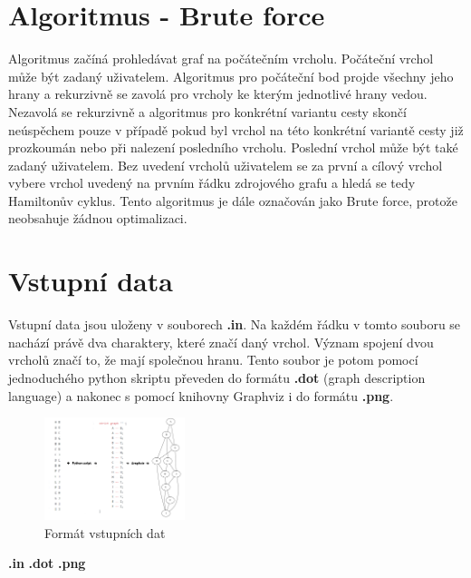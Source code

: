 \documentclass[a4paper,11pt]{article}
\begin{document}
\section{Algoritmus - Brute force}

Algoritmus začíná prohledávat graf na počátečním vrcholu. Počáteční vrchol může být zadaný uživatelem. Algoritmus pro počáteční bod projde všechny jeho hrany a rekurzivně se zavolá pro vrcholy ke kterým jednotlivé hrany vedou. Nezavolá se rekurzivně a algoritmus pro konkrétní variantu cesty skončí neúspěchem pouze v případě pokud byl vrchol na této konkrétní variantě cesty již prozkoumán nebo při nalezení posledního vrcholu. Poslední vrchol může být také zadaný uživatelem. Bez uvedení vrcholů uživatelem se za první a cílový vrchol vybere vrchol uvedený na prvním řádku zdrojového grafu a hledá se tedy Hamiltonův cyklus. Tento algoritmus je dále označován jako Brute force, protože neobsahuje žádnou optimalizaci.

\section{Vstupní data}

Vstupní data jsou uloženy v souborech \textbf{.in}. Na každém řádku v tomto souboru se nachází právě dva charaktery, které značí daný vrchol. Význam spojení dvou vrcholů značí to, že mají společnou hranu. Tento soubor je potom pomocí jednoduchého python skriptu převeden do formátu \textbf{.dot} (graph description language) a nakonec s pomocí knihovny Graphviz\cite{graphviz} i do formátu \textbf{.png}.

\newpage

\begin{figure}[!h]
\caption{Formát vstupních dat}
\includegraphics[width=4.1cm,keepaspectratio,trim={1.2cm 1.2cm 1.2cm 1.2cm},clip]{./inputData.png}
\centering
\end{figure}
\hspace{0,55cm}\textbf{\LARGE{.in}} \hspace{6cm} \textbf{\LARGE{.dot}} \hspace{4,6cm} \textbf{\LARGE{.png}}
\end{document}
